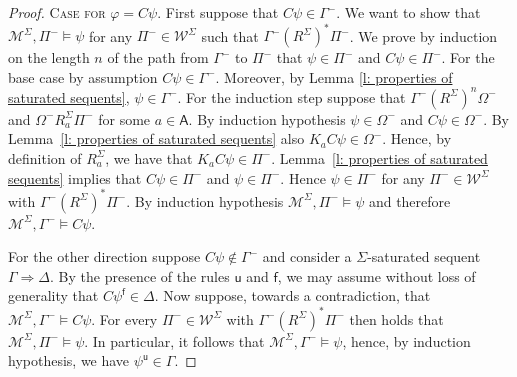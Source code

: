 \documentclass{myifcolog}
\newcommand\C {C}
\newcommand{\K}{K}
\newcommand\A{\mathsf{A}}
\newcommand{\agi}{a}
\newcommand{\fw}{\mathcal{M}}
\newcommand{\f}{\mathsf{f}}
\renewcommand{\u}{\mathsf{u}}
\newcommand{\W}{\mathcal{W}}
\numberwithin{theorem}{section}
\begin{document}
\begin{proof}
    \noindent \textsc{Case for $\varphi = \C \psi$.} First suppose that $\C \psi \in \Gamma^-$. We want to show that $\fw^\Sigma, \Pi^- \models \psi$ for any $\Pi^- \in \W^\Sigma$ such that $\Gamma^- \mathrel{(R^\Sigma)^*} \Pi^-$. We prove by induction on the length $n$ of the path from $\Gamma^-$ to $\Pi^-$ that $\psi \in \Pi^-$ and $\C \psi \in \Pi^-$. For the base case by assumption $\C \psi \in \Gamma^-$. Moreover, by Lemma \ref{l: properties of saturated sequents}, $\psi \in \Gamma^-$. For the induction step suppose that $\Gamma^- \mathrel{(R^\Sigma)^n} \Omega^-$ and $\Omega^- \mathrel{R_\agi^\Sigma} \Pi^-$ for some $\agi \in \A$. By induction hypothesis $\psi \in \Omega^-$ and $\C \psi \in \Omega^-$. By Lemma~\ref{l: properties of saturated sequents} also $\K_\agi \C \psi \in \Omega^-$. Hence, by definition of $R_\agi^\Sigma$, we have that $\K_\agi \C \psi \in \Pi^-$. Lemma~\ref{l: properties of saturated sequents} implies that $\C \psi \in \Pi^-$ and $\psi \in \Pi^-$. Hence $\psi \in \Pi^-$ for any $\Pi^- \in \W^\Sigma$ with $\Gamma^- \mathrel{(R^\Sigma)^*} \Pi^-$. By induction hypothesis $\fw^\Sigma, \Pi^- \models \psi$ and therefore $\fw^\Sigma, \Gamma^- \models \C \psi$. \smallskip
    
	For the other direction suppose $\C \psi \notin \Gamma^-$ and consider a $\Sigma$-saturated sequent $\Gamma \Rightarrow \Delta$.  By the presence of the rules $\mathsf{u}$ and $\mathsf{f}$, we may assume without loss of generality that $\C \psi^\f \in \Delta$. Now suppose, towards a contradiction, that $\fw^\Sigma, \Gamma^-  \models \C \psi$. For every $\Pi^- \in \W^\Sigma$ with $\Gamma^- \mathrel{(R^\Sigma)^*} \Pi^-$ then holds that $\fw^\Sigma, \Pi^- \models \psi$. In particular, it follows that $\fw^\Sigma, \Gamma^- \models \psi$, hence, by induction hypothesis, we have $\psi^\u \in \Gamma$.
			

\end{proof}
\end{document}
